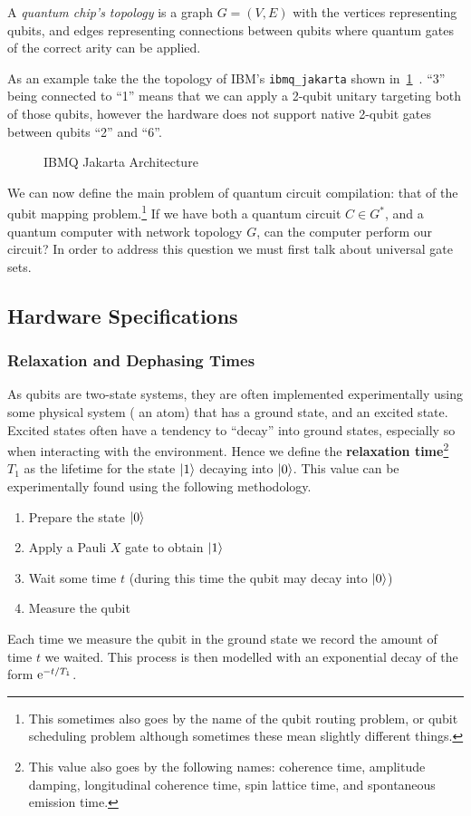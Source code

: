 \begin{definition}
    A \emph{quantum chip's topology} is a graph $G = (V, E)$ with the vertices representing qubits, and edges representing connections between qubits where quantum gates of the correct arity can be applied.
\end{definition}

As an example take the the topology of IBM's \texttt{ibmq\_jakarta} shown in~\ref{fig:ibm-jakarta}~\cite{ibmq}.
``3'' being connected to ``1'' means that we can apply a 2-qubit unitary targeting both of those qubits, however the hardware does not support native 2-qubit gates between qubits ``2'' and ``6''.
\begin{figure}[ht]
    \centering
    
    \caption{IBMQ Jakarta Architecture}\label{fig:ibm-jakarta}
\end{figure}

We can now define the main problem of quantum circuit compilation: that of the qubit mapping problem.\footnote{This sometimes also goes by the name of the qubit routing problem, or qubit scheduling problem although sometimes these mean slightly different things.}
If we have both a quantum circuit $C\in G^*$, and a quantum computer with network topology $G$, can the computer perform our circuit?
In order to address this question we must first talk about universal gate sets.


\subsection{Hardware Specifications}

\subsubsection{Relaxation and Dephasing Times}\label{sec:Ttimes}

As qubits are two-state systems, they are often implemented experimentally using some physical system (\eg{} an atom) that has a ground state, and an excited state.
Excited states often have a tendency to ``decay'' into ground states, especially so when interacting with the environment.
Hence we define the \textbf{relaxation time}\footnote{This value also goes by the following names: coherence time, amplitude damping, longitudinal coherence time, spin lattice time, and spontaneous emission time.} $T_1$ as the lifetime for the state $\ket{1}$ decaying into $\ket{0}$.
This value can be experimentally found using the following methodology.
\begin{enumerate}
    \item Prepare the state $\ket{0}$
    \item Apply a Pauli $X$ gate to obtain $\ket{1}$
    \item Wait some time $t$ (during this time the qubit may decay into $\ket{0}$)
    \item Measure the qubit
\end{enumerate}
Each time we measure the qubit in the ground state we record the amount of time $t$ we waited.
This process is then modelled with an exponential decay of the form $\mathrm{e}^{-t/T_1}$.


